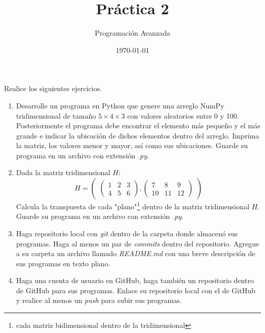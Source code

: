 \documentclass{article}
\title{Práctica 2}
\date{\today}
\author{Programación Avanzada}
\begin{document}
\maketitle

Realice los siguientes ejercicios.

\begin{enumerate}
    \item Desarrolle un programa en Python que genere una arreglo NumPy tridimensional de 
        tamaño $5\times 4\times 3$ con valores aleatorios entre 0 y 100. Posteriormente
        el programa debe encontrar el elemento más pequeño y el más grande e indicar la 
        ubicación de dichos elementos dentro del arreglo. Imprima la matriz, los valores 
        menor y mayor, así como sus ubicaciones. Guarde su programa en un archivo con 
        extensión \textit{.py}.

    \item 
        Dada la matriz tridimensional $H$: 
        \[
            H = 
                \begin{pmatrix}
                    \begin{pmatrix}
                        1 & 2 & 3 \\
                        4 & 5 & 6
                    \end{pmatrix},
                    \begin{pmatrix}
                        7 & 8 & 9 \\
                        10 & 11 & 12
                    \end{pmatrix}    
                \end{pmatrix}
        \]
        Calcula la transpuesta de cada "plano"\footnote[1]{cada matriz bidimensional 
        dentro de la tridimensional} dentro de la matriz tridimensional $H$. Guarde su 
        programa en un archivo con extensión \textit{.py}.

    \item Haga repositorio local con \textit{git} dentro de la carpeta donde almacenó 
        sus programas. Haga al menos un par de \textit{commits} dentro del repositorio.
        Agregue a su carpeta un archivo llamado \textit{README.md} con una breve 
        descripción de sus programas en texto plano.

    \item Haga una cuenta de usuario en GitHub, haga también un repositorio dentro de 
        GitHub para sus programas. Enlace su repositorio local con el de GitHub y 
        realice al menos un \textit{push} para subir sus programas.

\end{enumerate}
\end{document}
